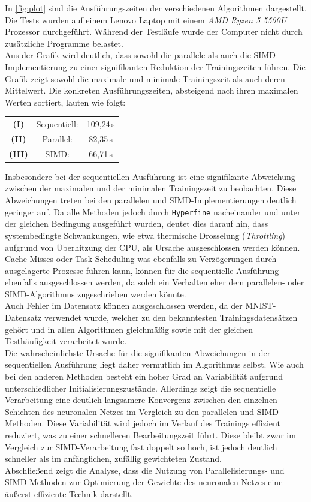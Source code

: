 \documentclass[a4paper, 12pt]{article}
\begin{document}
In \autoref{fig:plot} sind die Ausführungszeiten der verschiedenen Algorithmen 
dargestellt. Die Tests wurden auf einem Lenovo Laptop mit einem \textit{AMD Ryzen 5 5500U}
Prozessor durchgeführt. Während der Testläufe wurde der Computer nicht durch zusätzliche 
Programme belastet.\\
Aus der Grafik wird deutlich, dass sowohl die parallele als auch die 
SIMD-Implementierung zu einer signifikanten Reduktion der Trainingszeiten führen. Die 
Grafik zeigt sowohl die maximale und minimale Trainingszeit als auch deren Mittelwert. 
Die konkreten Ausführungszeiten, absteigend nach ihren maximalen Werten sortiert, 
lauten wie folgt:

\begin{center}
	\begin{tabular}{c c c}
	\textbf{(I)} & Sequentiell: & 109,24\,s \\
	\textbf{(II)} & Parallel: & 82,35\,s \\
	\textbf{(III)} & SIMD: & 66,71\,s \\
	\end{tabular}
\end{center}
	
Insbesondere bei der sequentiellen Ausführung ist eine signifikante Abweichung zwischen 
der maximalen und der minimalen Trainingszeit zu beobachten. Diese Abweichungen treten 
bei den parallelen und SIMD-Implementierungen deutlich geringer auf. Da alle Methoden jedoch
durch \texttt{Hyperfine} nacheinander und unter der gleichen Bedingung ausgeführt wurden,
deutet dies darauf hin, dass systembedingte Schwankungen, wie etwa thermische Drosselung 
(\textit{Throttling}) aufgrund von Überhitzung der CPU, als Ursache ausgeschlossen 
werden können. 
Cache-Misses oder Task-Scheduling was ebenfalls zu Verzögerungen durch ausgelagerte 
Prozesse führen kann, können für die sequentielle Ausführung ebenfalls ausgeschlossen werden,
da solch ein Verhalten eher dem parallelen- oder SIMD-Algorithmus zugeschrieben werden könnte.\\
Auch Fehler im Datensatz können ausgeschlossen werden, da der MNIST-Datensatz verwendet 
wurde, welcher zu den bekanntesten Trainingsdatensätzen gehört und in allen Algorithmen 
gleichmäßig sowie mit der gleichen Testhäufigkeit verarbeitet wurde.\\
Die wahrscheinlichste Ursache für die signifikanten Abweichungen in der sequentiellen 
Ausführung liegt daher vermutlich im Algorithmus selbst. Wie auch bei den anderen 
Methoden besteht ein hoher Grad an Variabilität aufgrund unterschiedlicher 
Initialisierungszustände. Allerdings zeigt die sequentielle Verarbeitung eine deutlich 
langsamere Konvergenz zwischen den einzelnen Schichten des neuronalen Netzes im 
Vergleich zu den parallelen und SIMD-Methoden. Diese Variabilität wird jedoch im Verlauf 
des Trainings effizient reduziert, was zu einer schnelleren Bearbeitungszeit führt. 
Diese bleibt zwar im Vergleich zur SIMD-Verarbeitung fast doppelt so hoch, ist jedoch 
deutlich schneller als im anfänglichen, zufällig gewichteten Zustand.\\
Abschließend zeigt die Analyse, dass die Nutzung von Parallelisierungs- und SIMD-Methoden 
zur Optimierung der Gewichte des neuronalen Netzes eine äußerst effiziente Technik 
darstellt.
\end{document}
